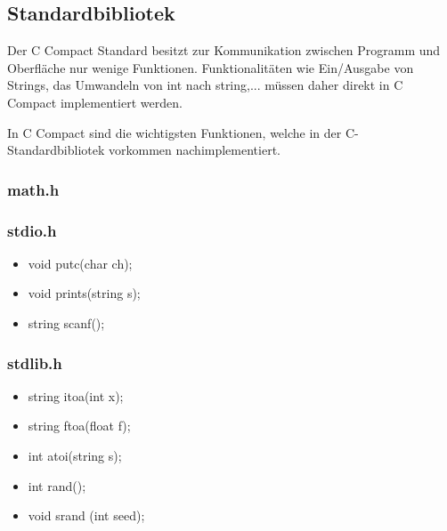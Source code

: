 
\subsection{Standardbibliotek}

Der C Compact Standard besitzt zur Kommunikation zwischen Programm und Oberfläche nur wenige Funktionen. Funktionalitäten wie Ein/Ausgabe von Strings, das Umwandeln von int nach string,... müssen daher direkt in C Compact implementiert werden.

In C Compact sind die wichtigsten Funktionen, welche in der C-Standardbibliotek vorkommen nachimplementiert.

\subsubsection{math.h}

\subsubsection{stdio.h}

\begin{itemize}
  \item void putc(char ch);
  \item void prints(string s);
  \item string scanf();
\end{itemize}

\subsubsection{stdlib.h}

\begin{itemize}
  \item string itoa(int x);
  \item string ftoa(float f);
  \item int atoi(string s);
  \item int rand();
  \item void srand (int seed);
\end{itemize}


